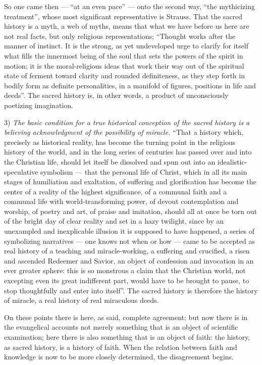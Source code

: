 \documentclass[12pt,a4paper,openany]{book}
\newcommand{\opage}[1]{\marginnote{\footnotesize\textit{[#1]}}}
\begin{document}
So one came then --- ``at an even pace'' --- onto
the second way, ``the mythicizing treatment'', whose
\setcounter{footnote}{0}%
\opage{293}most significant representative is Strauss. That the sacred
history is a myth, a web of myths, means that
what we have before us here are not real facts, but only religious
representations; ``Thought works
after the manner of instinct. It is the strong, as yet undeveloped
urge to clarify for itself what fills the innermost
being of the soul that sets the powers of the spirit in motion;
it is the moral-religious ideas that work their way out of
the spiritual state of ferment toward clarity and rounded
definiteness, as they step forth in bodily form
as definite personalities, in a manifold of
figures, positions in life and deeds''. The sacred history
is, in other words, a product of unconsciously poetizing
imagination.

3) \emph{The basic condition for a true historical conception
of the sacred history is a believing
acknowledgment of the possibility of miracle.} ``That a
history which, precisely as historical reality, has become
the turning point in the religious history of the world, and in the
long series of centuries has passed over and into
the Christian life, should let itself be dissolved and spun out into
an idealistic-speculative symbolism --- that the personal
life of Christ, which in all its main stages of humiliation and
exaltation, of suffering and glorification has become the center
of a reality of the highest significance, of
a communal faith and a communal life with world-transforming
power, of devout contemplation and worship,
of poetry and art, of praise and imitation,
should all at once be torn out of the bright day of clear
reality and set in a hazy twilight, since by
an unexampled and inexplicable illusion it is supposed to have happened,
\setcounter{footnote}{0}%
\opage{294}a series of symbolizing narratives --- one knows not
when or how --- came to be accepted as
real history of a teaching and miracle-working, a
suffering and crucified, a risen and ascended Redeemer
and Savior, an object of confession and invocation
in an ever greater sphere: this is so monstrous
a claim that the Christian world, not excepting even its great
indifferent part, would have to be brought to pause,
to stop thoughtfully and enter into itself''. The
sacred history is therefore the history of miracle, a real
history of real miraculous deeds.

On these points there is here, as said, complete
agreement; but now there is in the evangelical accounts
not merely something that is an object of scientific
examination; here there is also something that is an object of
faith: the history, as sacred history, is a history of faith.
When the relation between faith and knowledge is now to be more closely
determined, the disagreement begins.
\end{document}
